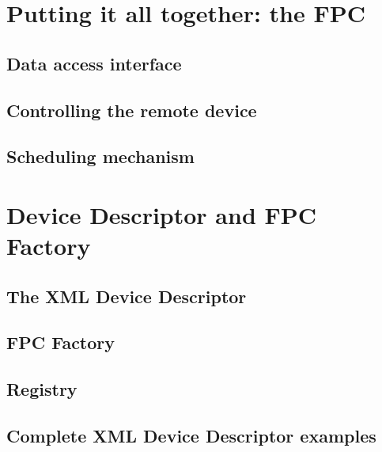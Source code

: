 \section{Putting it all together: the FPC}

\subsection{Data access interface}

\subsection{Controlling the remote device}

\subsection{Scheduling mechanism}


\section{Device Descriptor and FPC Factory}

\subsection{The XML Device Descriptor}

\subsection{FPC Factory}

\subsection{Registry}

\subsection{Complete XML Device Descriptor examples}